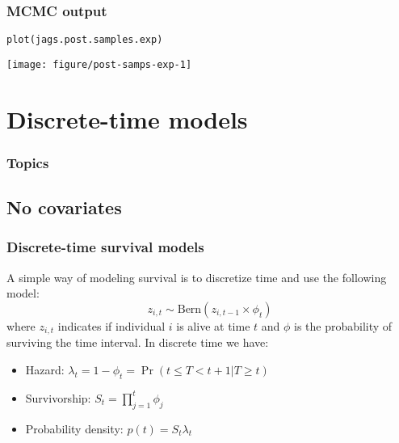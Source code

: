 \documentclass[color=usenames,dvipsnames]{beamer}\usepackage[]{graphicx}\usepackage[]{color}
\makeatletter
\newcommand{\hlstd}[1]{\textcolor[rgb]{0,0,0}{#1}}%
\newcommand{\hlkwd}[1]{\textcolor[rgb]{0.004,0.004,0.506}{#1}}%
\newenvironment{kframe}{%
 \def\at@end@of@kframe{}%
 \ifinner\ifhmode%
  \def\at@end@of@kframe{\end{minipage}}%
  \begin{minipage}{\columnwidth}%
 \fi\fi%
 \def\FrameCommand##1{\hskip\@totalleftmargin \hskip-\fboxsep
 \colorbox{shadecolor}{##1}\hskip-\fboxsep
     \hskip-\linewidth \hskip-\@totalleftmargin \hskip\columnwidth}%
 \MakeFramed {\advance\hsize-\width
   \@totalleftmargin\z@ \linewidth\hsize
   \@setminipage}}%
 {\par\unskip\endMakeFramed%
 \at@end@of@kframe}
\newenvironment{knitrout}{}{} %
\makeatother
\begin{document}
\begin{frame}[fragile]
  \frametitle{MCMC output}
\begin{knitrout}
\color{fgcolor}\begin{kframe}
\begin{alltt}
\hlkwd{plot}\hlstd{(jags.post.samples.exp)}
\end{alltt}
\end{kframe}

{\centering \texttt{[image: figure/post-samps-exp-1]} 

}


\end{knitrout}
\end{frame}


\section{Discrete-time models}



\begin{frame}[plain]
  \frametitle{Topics}
  \Large
  \tableofcontents[currentsection]
\end{frame}

\subsection{No covariates}


\begin{frame}
  \frametitle{Discrete-time survival models}
  A simple way of modeling survival is to discretize time and use the
  following model:
  \[
    z_{i,t} \sim \mathrm{Bern}(z_{i,t-1}\times \phi_t)
  \]
  where $z_{i,t}$ indicates if individual $i$ is alive at time $t$ and
  $\phi$ is the probability of surviving the time interval.
  \pause
  \vfill
  In discrete time we have:
  \begin{itemize}
    \item Hazard: $\lambda_t = 1-\phi_t = \Pr(t \le T < t+1 | T\ge t)$
    \item Survivorship: $S_t = \prod_{j=1}^t \phi_j$
    \item Probability density: $p(t) = S_t \lambda_t$
  \end{itemize}
\end{frame}




\end{document}
